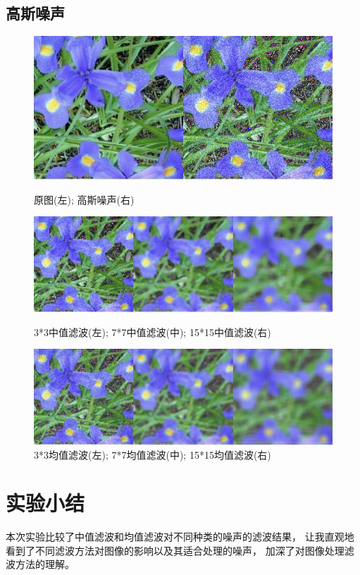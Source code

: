 \documentclass[a4paper]{ctexart}
\begin{document}
  \subsection*{高斯噪声}
  \begin{figure}[H]
    \includegraphics*[width=1.0\textwidth]{fig/gauss_noise.png}
    \caption{原图(左); 高斯噪声(右)}
    \includegraphics*[width=1.0\textwidth]{fig/gauss_median.png}
    \caption{3*3中值滤波(左); 7*7中值滤波(中); 15*15中值滤波(右)}
    \includegraphics*[width=1.0\textwidth]{fig/gauss_blur.png}
    \caption{3*3均值滤波(左); 7*7均值滤波(中); 15*15均值滤波(右)}
  \end{figure}

  \section{实验小结}
  本次实验比较了中值滤波和均值滤波对不同种类的噪声的滤波结果，
  让我直观地看到了不同滤波方法对图像的影响以及其适合处理的噪声，
  加深了对图像处理滤波方法的理解。
\end{document}
